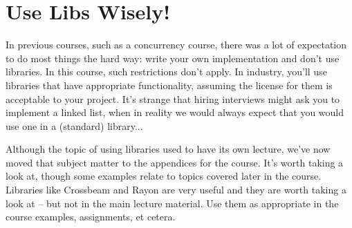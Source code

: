 \section*{Use Libs Wisely!}
In previous courses, such as a concurrency course, there was a lot of expectation to do most things the hard way: write your own implementation and don't use libraries. In this course, such restrictions don't apply. In industry, you'll use libraries that have appropriate functionality, assuming the license for them is acceptable to your project. It's strange that hiring interviews might ask you to implement a linked list, when in reality we would always expect that you would use one in a (standard) library...

Although the topic of using libraries used to have its own lecture, we've now moved that subject matter to the appendices for the course. It's worth taking a look at, though some examples relate to topics covered later in the course. Libraries like Crossbeam and Rayon are very useful and they are worth taking a look at -- but not in the main lecture material. Use them as appropriate in the course examples, assignments, et cetera.




